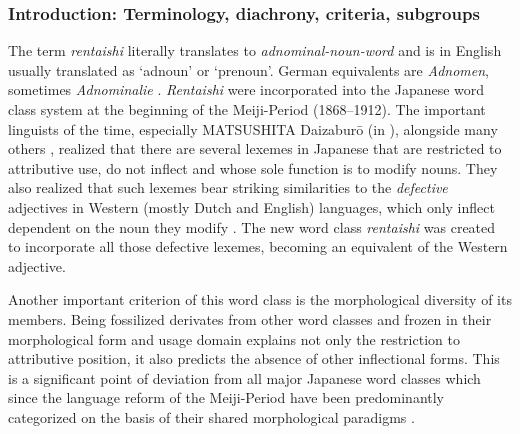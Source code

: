 \subsubsection{Introduction: Terminology, diachrony, criteria, subgroups}

The term \textit{rentaishi} literally translates to \textit{adnominal-noun-word} and is in English usually translated as `adnoun’ or `prenoun’. German equivalents are \textit{Adnomen}, sometimes \textit{Adnominalie} \citep{rickmeyer:1995:japanische}. \textit{Rentaishi} were incorporated into the Japanese word class system at the beginning of the Meiji-Period (1868--1912). The important linguists of the time, especially MATSUSHITA Daizaburō (in \citealt{matsushita:1976:kaisen}), alongside many others \citep{yamada:1908:nihon, mitsuya:1932:bunpo, sekine:1937:fukutaishi, kieda:1938:koto, tokieda:1941:kokugogaku, yuzawa:1979:kokugo}, realized that there are several lexemes in Japanese that are restricted to attributive use, do not inflect and whose sole function is to modify nouns. They also realized that such lexemes bear striking similarities to the \textit{defective} adjectives in Western (mostly Dutch and English) languages, which only inflect dependent on the noun they modify \citep{sugimoto:1967:kindai, sugimoto:1991:kokugo, kim:2006:kindai}. The new word class \textit{rentaishi} was created to incorporate all those defective lexemes, becoming an equivalent of the Western adjective. 

\largerpage
Another important criterion of this word class is the morphological diversity of its members. Being fossilized derivates from other word classes and frozen in their morphological form and usage domain explains not only the restriction to attributive position, it also predicts the absence of other inflectional forms. This is a significant point of deviation from all major Japanese word classes which since the language reform of the Meiji-Period have been predominantly categorized on the basis of their shared morphological paradigms \citep{nitta:2000:bun}.

